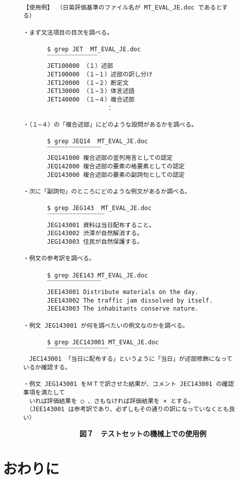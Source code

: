 \begin{figure}
\begin{small}
\begin{verbatim}

【使用例】 （日英評価基準のファイル名が MT_EVAL_JE.doc であるとする）

・まず文法項目の目次を調べる。

　　　　$ grep JET  MT_EVAL_JE.doc
　　　　‾‾‾‾‾‾‾‾‾‾‾‾‾‾
　　　　JET100000 （１）述部
　　　　JET100000 （１−１）述部の訳し分け
　　　　JET120000 （１−２）断定文
　　　　JET130000 （１−３）体言述語
　　　　JET140000 （１−４）複合述部
　　　　　　　　　　　　　　：

・（１−４）の「複合述部」にどのような設問があるかを調べる。

　　　　$ grep JEQ14  MT_EVAL_JE.doc
　　　　‾‾‾‾‾‾‾‾‾‾‾‾‾‾‾
　　　　JEQ141000 複合述部の並列用言としての認定
　　　　JEQ142000 複合述部の要素の格要素としての認定
　　　　JEQ143000 複合述部の要素の副詞句としての認定

・次に「副詞句」のところにどのような例文があるか調べる。

　　　　$ grep JEG143  MT_EVAL_JE.doc
　　　　‾‾‾‾‾‾‾‾‾‾‾‾‾‾‾‾
　　　　JEG143001 資料は当日配布すること。
　　　　JEG143002 渋滞が自然解消する。
　　　　JEG143003 住民が自然保護する。

・例文の参考訳を調べる。

　　　　$ grep JEE143 MT_EVAL_JE.doc
　　　　‾‾‾‾‾‾‾‾‾‾‾‾‾‾‾
　　　　JEE143001 Distribute materials on the day.
　　　　JEE143002 The traffic jam dissolved by itself.
　　　　JEE143003 The inhabitants conserve nature.

・例文 JEG143001 が何を調べたいの例文なのかを調べる。

　　　　$ grep JEC143001 MT_EVAL_JE.doc
　　　　‾‾‾‾‾‾‾‾‾‾‾‾‾‾‾‾‾
　JEC143001 「当日に配布する」というように「当日」が述部修飾になっているか確認する。

・例文 JEG143001 をＭＴで訳させた結果が、コメント JEC143001 の確認事項を満たして
　いれば評価結果を ○ 、さもなければ評価結果を × とする。
　（JEE143001 は参考訳であり、必ずしもその通りの訳になっていなくとも良い）

\end{verbatim}
\end{small}
{\bf　　　　　　　　図７　テストセットの機械上での使用例}
\end{figure}


\section{おわりに}

